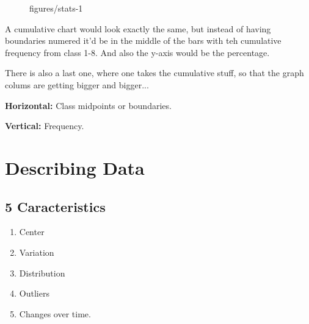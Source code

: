\documentclass{book}
\begin{document}
\begin{figure}[ht]
    \centering
    \caption{figures/stats-1}
    \label{fig:stats-1}
\end{figure}

A cumulative chart would look exactly the same, but instead of having
boundaries numered it'd be in the middle of the bars with teh cumulative
frequency from class 1-8. And also the y-axis would be the percentage.

There is also a last one, where one takes the cumulative stuff, so that the
graph colums are getting bigger and bigger...

\textbf{Horizontal:} Class midpoints or boundaries.

\textbf{Vertical:} Frequency.



\chapter{Describing Data}

\section{5 Caracteristics} \begin{enumerate}
    \item Center
    \item Variation
    \item Distribution
    \item Outliers 
    \item Changes over time.
\end{enumerate}
\end{document}
